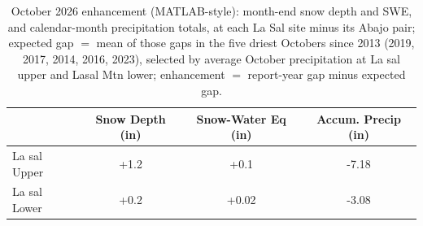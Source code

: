 \begin{table}[h!]
  \centering
  \begin{tabular}{lccc}
    \hline
    & Snow Depth (in) & Snow-Water Eq (in) & Accum. Precip (in) \\
    \hline
    La sal Upper & +1.2 & +0.1 & -7.18 \\
    La sal Lower & +0.2 & +0.02 & -3.08 \\
    \hline
  \end{tabular}
  \caption{October 2026 enhancement (MATLAB-style): month-end snow depth and SWE, and calendar-month precipitation totals, at each La Sal site minus its Abajo pair; expected gap $=$ mean of those gaps in the five driest Octobers since 2013 (2019, 2017, 2014, 2016, 2023), selected by average October precipitation at La sal upper and Lasal Mtn lower; enhancement $=$ report-year gap minus expected gap.}
  \label{fig:enhancement}
\end{table}